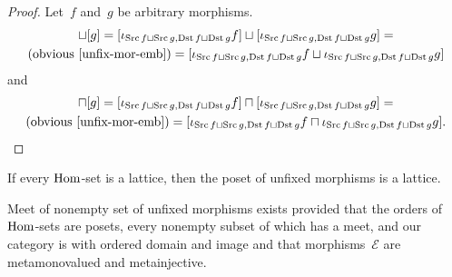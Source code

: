 \begin{proof}
Let~$f$ and~$g$ be arbitrary morphisms.
\begin{multline*}
[f]\sqcup[g] =
[\iota_{\Src f\sqcup\Src g,\Dst f\sqcup\Dst g}f]\sqcup
[\iota_{\Src f\sqcup\Src g,\Dst f\sqcup\Dst g}g] = \\
\text{(obvious~\ref{unfix-mor-emb})} =
[\iota_{\Src f\sqcup\Src g,\Dst f\sqcup\Dst g}f\sqcup
\iota_{\Src f\sqcup\Src g,\Dst f\sqcup\Dst g}g]
\end{multline*}
and
\begin{multline*}
[f]\sqcap[g] =
[\iota_{\Src f\sqcup\Src g,\Dst f\sqcup\Dst g}f]\sqcap
[\iota_{\Src f\sqcup\Src g,\Dst f\sqcup\Dst g}g] = \\
\text{(obvious~\ref{unfix-mor-emb})} =
[\iota_{\Src f\sqcup\Src g,\Dst f\sqcup\Dst g}f\sqcap
\iota_{\Src f\sqcup\Src g,\Dst f\sqcup\Dst g}g].
\end{multline*}
\end{proof}

\begin{cor}
If every $\operatorname{Hom}$-set is a lattice, then
the poset of unfixed morphisms is a lattice.
\end{cor}

\begin{thm}
Meet of nonempty set of unfixed morphisms
exists provided that the orders of $\operatorname{Hom}$-sets are
posets, every nonempty subset of which has a meet, and
our category is with ordered domain
and image and that morphisms~$\mathcal{E}$ are metamonovalued
and metainjective.
\end{thm}

